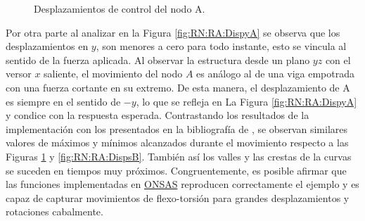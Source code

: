 \begingroup
\centering
\begin{figure}[htbp]
	\centering
	\caption{Desplazamientos de control del nodo A.} \label{fig:RN:RA:DispsA}
\end{figure}
\endgroup

Por otra parte al analizar en la Figura \ref{fig:RN:RA:DispyA} se observa que los desplazamientos en $y$, son menores a cero para todo instante, esto se vincula al sentido de la fuerza aplicada. Al observar la estructura desde un plano $yz$ con el versor $x$ saliente, el movimiento del nodo $A$ es análogo al de una viga empotrada con una fuerza cortante en su extremo. De esta manera, el desplazamiento de A es siempre en el sentido de $-y$, lo que se refleja en La Figura \ref{fig:RN:RA:DispyA} y condice con la respuesta esperada. Contrastando los resultados de la implementación con los presentados en la bibliografía de \cite{Le2014}, se observan similares valores de máximos y mínimos alcanzados durante el movimiento respecto a las Figuras \ref{fig:RN:RA:DispsA} y \ref{fig:RN:RA:DispsB}. También así los valles y las crestas de la curvas se suceden en tiempos muy próximos. Congruentemente, es posible afirmar que las funciones implementadas en \href{https://github.com/ONSAS/ONSAS/}{ONSAS} reproducen correctamente el ejemplo y es capaz de capturar movimientos de flexo-torsión para grandes desplazamientos y rotaciones cabalmente. 


